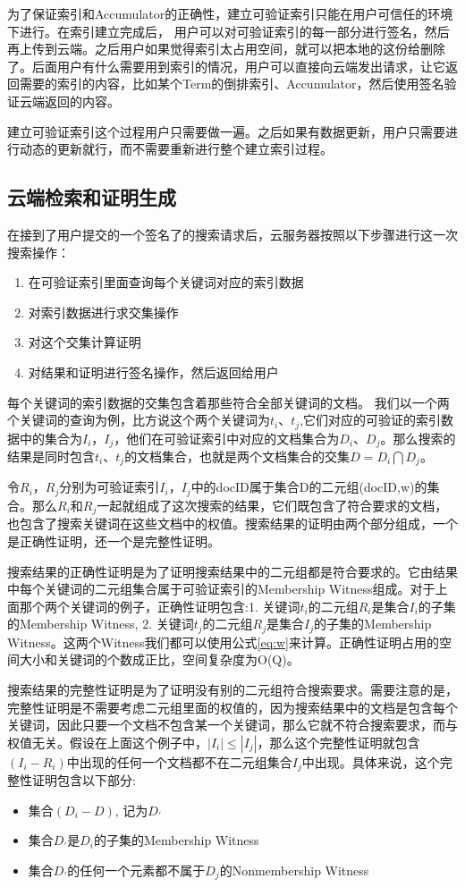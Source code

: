 为了保证索引和Accumulator的正确性，建立可验证索引只能在用户可信任的环境下进行。在索引建立完成后， 用户可以对可验证索引的每一部分进行签名，然后再上传到云端。之后用户如果觉得索引太占用空间，就可以把本地的这份给删除了。后面用户有什么需要用到索引的情况，用户可以直接向云端发出请求，让它返回需要的索引的内容，比如某个Term的倒排索引、Accumulator，然后使用签名验证云端返回的内容。

建立可验证索引这个过程用户只需要做一遍。之后如果有数据更新，用户只需要进行动态的更新就行，而不需要重新进行整个建立索引过程。

\subsection{云端检索和证明生成}
在接到了用户提交的一个签名了的搜索请求后，云服务器按照以下步骤进行这一次搜索操作：
\begin{enumerate}
\item 在可验证索引里面查询每个关键词对应的索引数据
\item 对索引数据进行求交集操作
\item 对这个交集计算证明
\item 对结果和证明进行签名操作，然后返回给用户
\end{enumerate}

每个关键词的索引数据的交集包含着那些符合全部关键词的文档。
我们以一个两个关键词的查询为例，比方说这个两个关键词为$t_i$、$t_j$,它们对应的可验证的索引数据中的集合为$I_i$，$I_j$，他们在可验证索引中对应的文档集合为$D_i$、$D_j$。那么搜索的结果是同时包含$t_i$、$t_j$的文档集合，也就是两个文档集合的交集$D = D_i \bigcap D_j$。

令$R_i$，$R_j$分别为可验证索引$I_i$，$I_j$中的docID属于集合D的二元组(docID,w)的集合。那么$R_i$和$R_j$一起就组成了这次搜索的结果，它们既包含了符合要求的文档，也包含了搜索关键词在这些文档中的权值。搜索结果的证明由两个部分组成，一个是正确性证明，还一个是完整性证明。

搜索结果的正确性证明是为了证明搜索结果中的二元组都是符合要求的。它由结果中每个关键词的二元组集合属于可验证索引的Membership Witness组成。对于上面那个两个关键词的例子，正确性证明包含:1. 关键词$t_i$的二元组$R_i$是集合$I_i$的子集的Membership Witness, 2. 关键词$t_j$的二元组$R_j$是集合$I_j$的子集的Membership Witness。这两个Witness我们都可以使用公式\ref{eq:w}来计算。正确性证明占用的空间大小和关键词的个数成正比，空间复杂度为O(Q)。

搜索结果的完整性证明是为了证明没有别的二元组符合搜索要求。需要注意的是，完整性证明是不需要考虑二元组里面的权值的，因为搜索结果中的文档是包含每个关键词，因此只要一个文档不包含某一个关键词，那么它就不符合搜索要求，而与权值无关。假设在上面这个例子中，$|I_i| \le |I_j|$，那么这个完整性证明就包含$(I_i - R_i)$中出现的任何一个文档都不在二元组集合$I_j$中出现。具体来说，这个完整性证明包含以下部分:
\begin{itemize}
\item 集合$(D_i - D)$, 记为$D_\prime$
\item 集合$D_\prime$是$D_i$的子集的Membership Witness
\item 集合$D_\prime$的任何一个元素都不属于$D_j$的Nonmembership Witness
\end{itemize}

